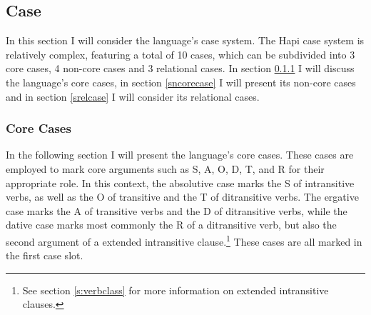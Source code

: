 \documentclass[a4paper, 12pt, oneside]{memoir}
\begin{document}
\subsection{Case}\label{scase}
In this section I will consider the language's case system. The Hapi case system is relatively complex, featuring a total of 10 cases, which can be subdivided into 3 core cases, 4 non-core cases and 3 relational cases. In section \ref{scorecase} I will discuss the language's core cases, in section \ref{sncorecase} I will present its non-core cases and in section \ref{srelcase} I will consider its relational cases. 
\subsubsection{Core Cases}\label{scorecase}
In the following section I will present the language's core cases. These cases are employed to mark core arguments such as S, A, O, D, T, and R for their appropriate role. In this context, the absolutive case marks the S of intransitive verbs, as well as the O of transitive and the T of ditransitive verbs. The ergative case marks the A of transitive verbs and the D of ditransitive verbs, while the dative case marks most commonly the R of a ditransitive verb, but also the second argument of a extended intransitive clause.\footnote{See section \ref{s:verbclass} for more information on extended intransitive clauses.} These cases are all marked in the first case slot.
\end{document}

